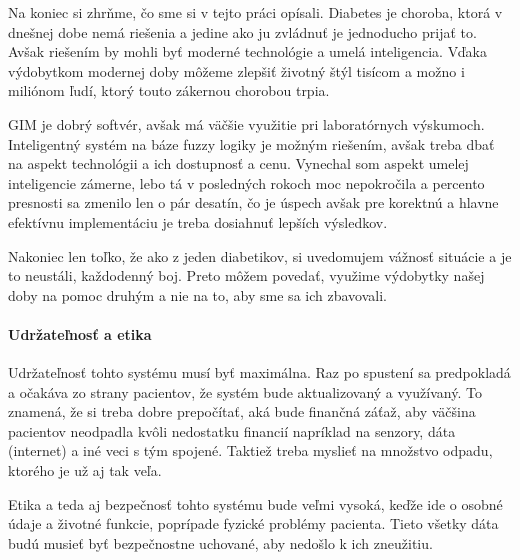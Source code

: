 Na koniec si zhrňme, čo sme si v tejto práci opísali. Diabetes je choroba, ktorá v dnešnej dobe nemá riešenia a jedine ako ju zvládnuť je jednoducho prijať to. Avšak riešením by mohli byť moderné technológie a umelá inteligencia.
Vďaka výdobytkom modernej doby môžeme zlepšiť životný štýl tisícom a možno i miliónom ľudí, ktorý touto zákernou chorobou trpia.

GIM je dobrý softvér, avšak má väčšie využitie pri laboratórnych výskumoch. Inteligentný systém na báze fuzzy logiky je možným riešením, avšak treba dbať na aspekt technológii a ich dostupnosť a cenu. Vynechal som aspekt umelej inteligencie zámerne, lebo tá v posledných rokoch moc nepokročila a percento presnosti sa zmenilo len o pár desatín, čo je úspech avšak pre korektnú a hlavne efektívnu implementáciu je treba dosiahnuť lepších výsledkov.

Nakoniec len toľko, že ako z jeden diabetikov, si uvedomujem vážnosť situácie a je to neustáli, každodenný boj.
Preto môžem povedať, využime výdobytky našej doby na pomoc druhým a nie na to, aby sme sa ich zbavovali.

\paragraph{Udržateľnosť a etika }
Udržateľnosť tohto systému musí byť maximálna. Raz po spustení sa predpokladá a očakáva zo strany pacientov, že systém bude aktualizovaný a využívaný. To znamená, že si treba dobre prepočítať, aká bude finančná záťaž, aby väčšina pacientov neodpadla kvôli nedostatku financií napríklad na senzory, dáta (internet) a iné veci s tým spojené. Taktiež treba myslieť na množstvo odpadu, ktorého je už aj tak veľa.

Etika a teda aj bezpečnosť tohto systému bude veľmi vysoká, keďže ide o osobné údaje a životné funkcie, poprípade fyzické problémy pacienta. Tieto všetky dáta budú musieť byť bezpečnostne uchované, aby nedošlo k ich zneužitiu.
